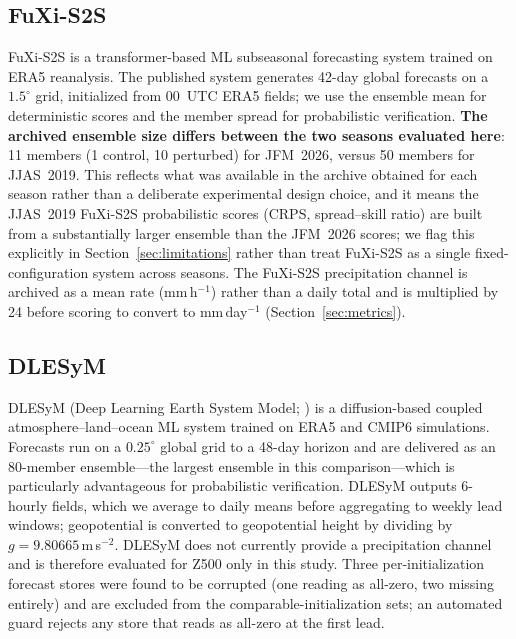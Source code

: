 \documentclass[11pt,a4paper]{article}
\begin{document}
\subsection{FuXi-S2S}\label{sec:fuxi}

FuXi-S2S \citep{chen2024} is a transformer-based ML subseasonal forecasting
system trained on ERA5 reanalysis. The published system generates 42-day
global forecasts on a $1.5^{\circ}$ grid, initialized from 00~UTC ERA5 fields;
we use the ensemble mean for deterministic scores and the member spread for
probabilistic verification. \textbf{The archived ensemble size differs between
the two seasons evaluated here}: 11 members (1 control, 10 perturbed) for
JFM~2026, versus 50 members for JJAS~2019. This reflects what was available in
the archive obtained for each season rather than a deliberate experimental
design choice, and it means the JJAS~2019 FuXi-S2S probabilistic scores
(CRPS, spread--skill ratio) are built from a substantially larger ensemble
than the JFM~2026 scores; we flag this explicitly in
Section~\ref{sec:limitations} rather than treat FuXi-S2S as a single
fixed-configuration system across seasons. The FuXi-S2S precipitation channel
is archived as a mean rate (mm\,h$^{-1}$) rather than a daily total and is
multiplied by 24 before scoring to convert to mm\,day$^{-1}$
(Section~\ref{sec:metrics}).

\subsection{DLESyM}\label{sec:delysm}

DLESyM (Deep Learning Earth System Model; \citealt{cresswellclay2024}) is a
diffusion-based coupled atmosphere--land--ocean ML system trained on ERA5 and
CMIP6 simulations. Forecasts run on a $0.25^{\circ}$ global grid to a 48-day
horizon and are delivered as an 80-member ensemble---the largest ensemble in
this comparison---which is particularly advantageous for probabilistic
verification. DLESyM outputs 6-hourly fields, which we average to daily means
before aggregating to weekly lead windows; geopotential is converted to
geopotential height by dividing by $g=9.80665$\,m\,s$^{-2}$. DLESyM does not
currently provide a precipitation channel and is therefore evaluated for Z500
only in this study. Three per-initialization forecast stores were found to be
corrupted (one reading as all-zero, two missing entirely) and are excluded
from the comparable-initialization sets; an automated guard rejects any store
that reads as all-zero at the first lead.
\end{document}
